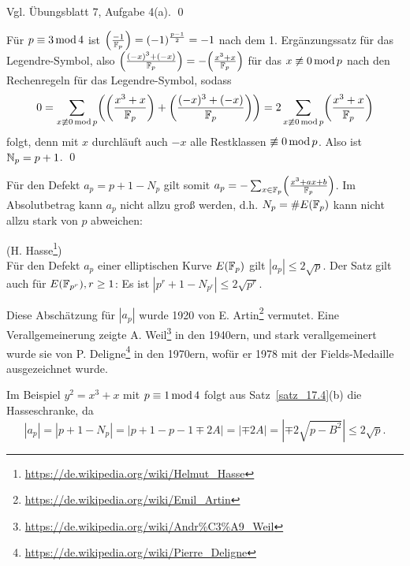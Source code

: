 	Vgl. Übungsblatt 7, Aufgabe 4(a). \qed
	
\begin{bew}
	Für $p \equiv 3 \operatorname{mod} 4$ ist $\left(\frac{-1}{\mathbb{F}_p}\right) = (-1)^\frac{p-1}{2} = -1$ nach dem 1. Ergänzungssatz für das Legendre-Symbol, also $\leg{(-x)^3+(-x)}{\FF_p} = -\leg{x^3+x}{\FF_p}$ für das $x \not\equiv 0 \operatorname{mod} p$ nach den Rechenregeln für das Legendre-Symbol, sodass
	\[
		0 = \sum_{x \not\kon 0 \modu p} \enbrace*{ \leg{x^3+x}{\FF_p} + \leg{(-x)^3+(-x)}{\FF_p}} = 2 \sum_{x \not\kon 0 \modu p} \leg{x^3 + x}{\FF_p}
	\]
	folgt, denn mit $x$ durchläuft auch $-x$ alle Restklassen $\not\equiv 0 \operatorname{mod} p$.
	Also ist $\mathbb{N}_p = p+1$. \qed
\end{bew}

\begin{bem}
	Für den Defekt $a_p = p+1-N_p$ gilt somit $a_p = - \sum_{x \in \FF_p} \leg{x^3+ax+b}{\FF_p}$.
	Im Absolutbetrag kann $a_p$ nicht allzu groß werden, d.h. $N_p = \#E(\mathbb{F}_p)$ kann nicht allzu stark von $p$ abweichen:
\end{bem}

\begin{satz}
	(H. Hasse\footnote{\url{https://de.wikipedia.org/wiki/Helmut_Hasse}}) \\
	Für den Defekt $a_p$ einer elliptischen Kurve $E(\mathbb{F}_p)$ gilt $|a_p| \leq 2 \sqrt{p}$.
	Der Satz gilt auch für $E(\mathbb{F}_{p^r}), r \geq 1$: Es ist $|p^r + 1 - N_{p^r}| \leq 2 \sqrt{p^r}$.
\end{satz}

\begin{bem}
	Diese Abschätzung für $|a_p|$ wurde 1920 von E. Artin\footnote{\url{https://de.wikipedia.org/wiki/Emil_Artin}} vermutet.
	Eine Verallgemeinerung zeigte A. Weil\footnote{\url{https://de.wikipedia.org/wiki/Andr\%C3\%A9_Weil}} in den 1940ern, und stark verallgemeinert wurde sie von P. Deligne\footnote{\url{https://de.wikipedia.org/wiki/Pierre_Deligne}} in den 1970ern, wofür er 1978 mit der Fields-Medaille ausgezeichnet wurde.
\end{bem}

\begin{bem}
	Im Beispiel $y^2 = x^3 + x$ mit $p \equiv 1 \operatorname{mod} 4$ folgt aus Satz~\ref{satz_17.4}(b) die Hasseschranke, da
	\[
		|a_p| = |p+1-N_p| = |p+1-p-1 \mp 2A| = |\mp 2A| = |\mp 2 \sqrt{p-B^2}| \leq 2 \sqrt{p}.
	\]
\end{bem}

